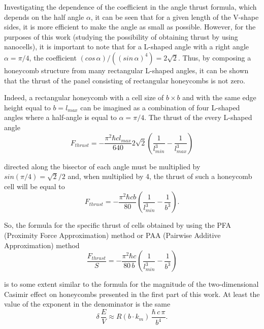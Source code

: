 \documentclass[twoside, 10pt, ptm]{article}
\begin{document}
\begin{multicols}{2}
    Investigating the dependence of the coefficient in the angle thrust
formula, which depends on the half angle \(\alpha\), it can be
seen that for a given length of the V-shape sides, it is more efficient
to make the angle as small as possible. However, for the purposes of
this work (studying the possibility of obtaining thrust by using
nanocells), it is important to note that for a L-shaped angle with a right angle
\(\alpha = {\pi}/{4}\), the coefficient
\(\left({cos\, \alpha}\right)\big/\left({\left(sin\, \alpha\right)^4}\right) = 2\sqrt{2}\).
Thus, by composing a honeycomb structure from many
rectangular L-shaped angles, it can be shown that the thrust of the panel consisting
of rectangular honeycombs is not zero.

Indeed, a rectangular honeycomb with a cell size of \(b \times b\) and
with the same edge height equal to \(b = l_{max}\) can be imagined as a
combination of four L-shaped angles where a half-angle is equal to
\(\alpha = {\pi}/{4}\). The thrust of the every L-shaped angle
\noindent
\begin{equation}F_{thrust} = - \frac{\pi^2\hbar c l_{max}}{640} 2\sqrt{2} \left(\frac{1}{l_{min}^3} - \frac{1}{l_{max}^3}\right)\end{equation}

directed along the bisector of each angle must be multiplied by
\(sin\left({\pi}/{4}\right)={\sqrt{2}}\big/{2}\) and, when multiplied by
4, the thrust of such a honeycomb cell will be equal to
\noindent
\begin{equation}F_{thrust} = - \frac{\pi^2\hbar c b}{80} \left(\frac{1}{l_{min}^3} - \frac{1}{b^3}\right).\end{equation}

So, the formula for the specific thrust of cells obtained by using the PFA
(Proximity Force Approximation) method or PAA (Pairwise Additive
Approximation) method
\noindent
\begin{equation}\frac{F_{thrust}}{S} = - \frac{\pi^2\hbar c}{80\, b} \left(\frac{1}{l_{min}^3} - \frac{1}{b^3}\right)\end{equation}

is to some extent similar to the formula for the magnitude of the
two-dimensional Casimir effect on honeycombs presented in the first part
of this work. At least the value of the exponent in the denominator is
the same
\noindent
\begin{equation}\delta\,\frac{E}{V} \approx R\left(b \cdot k_m\right)\,\frac{\hbar\,c\,\pi}{b^4}.\end{equation}


\end{multicols}
\end{document}

